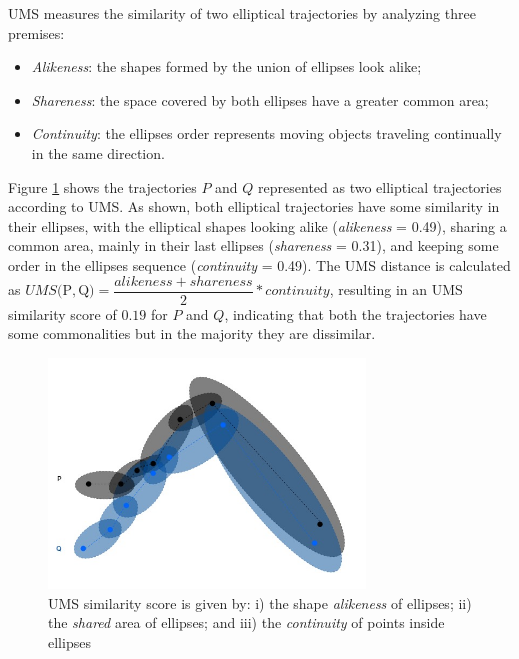 \documentclass[12pt]{article}
\begin{document}
UMS measures the similarity of two elliptical trajectories by analyzing three premises:
\begin{itemize}
  \item \textit{Alikeness}: the shapes formed by the union of ellipses look alike;
  \item \textit{Shareness}: the space covered by both ellipses have a greater common area;
  \item \textit{Continuity}: the ellipses order represents moving objects traveling continually in the same direction.
\end{itemize}

Figure \ref{fig:related_trajes_UMS} shows the trajectories $P$ and $Q$ represented as two elliptical trajectories according to UMS. As shown, both elliptical trajectories have some similarity in their ellipses, with the elliptical shapes looking alike (\emph{alikeness} = 0.49), sharing a common area, mainly in their last ellipses (\emph{shareness} = 0.31), and keeping some order in the ellipses sequence (\emph{continuity} = 0.49). The UMS distance is calculated as $UMS($P$, $Q$) = \dfrac{alikeness + shareness}{2} * continuity$, resulting in an UMS similarity score of $0.19$ for $P$ and $Q$, indicating that both the trajectories have some commonalities but in the majority they are dissimilar.

\begin{figure}[!h]
\centering
\includegraphics[width=0.75\textwidth]{Related_Works/related_trajes-UMS.jpg}
\caption{\label{fig:related_trajes_UMS}UMS similarity score is given by: i) the shape \textit{alikeness} of ellipses; ii) the \textit{shared} area of ellipses; and iii) the \textit{continuity} of points inside ellipses}
\end{figure}
\end{document}
